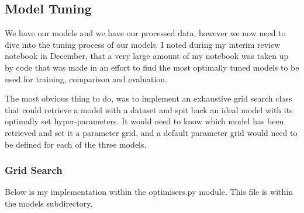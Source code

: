 \documentclass[letterpaper,10pt]{article}
\begin{document}
\subsection{Model Tuning}
We have our models and we have our processed data, however we now need to dive into the tuning process of our models. I noted during my interim review notebook in December, that a very large amount of my notebook was taken up by code that was made in an effort to find the most optimally tuned models to be used for training, comparison and evaluation. \par
The most obvious thing to do, was to implement an exhaustive grid search class that could retrieve a model with a dataset and spit back an ideal model with its optimally set hyper-parameters. It would need to know which model has been retrieved and set it a parameter grid, and a default parameter grid would need to be defined for each of the three models. \par
\subsubsection{Grid Search}
Below is my implementation within the optimisers.py module. This file is within the models subdirectory.
\end{document}
